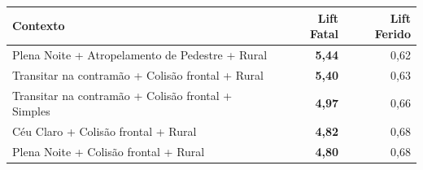\begin{tabular}{@{}>{\raggedright\arraybackslash}p{4.2cm}rr@{}}
\toprule
\textbf{Contexto} & \textbf{Lift Fatal} & \textbf{Lift Ferido} \\
\midrule
Plena Noite + Atropelamento de Pedestre + Rural & \textbf{5,44} & 0,62 \\
Transitar na contramão + Colisão frontal + Rural & \textbf{5,40} & 0,63 \\
Transitar na contramão + Colisão frontal + Simples & \textbf{4,97} & 0,66 \\
Céu Claro + Colisão frontal + Rural & \textbf{4,82} & 0,68 \\
Plena Noite + Colisão frontal + Rural & \textbf{4,80} & 0,68 \\
\bottomrule
\end{tabular}
